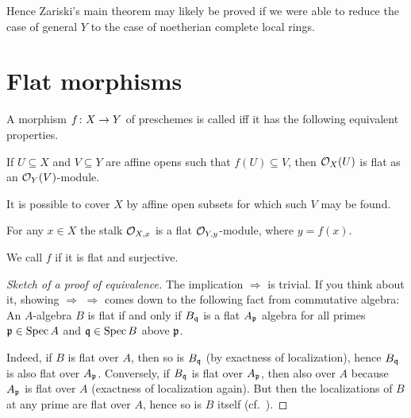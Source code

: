 \documentclass[a4paper,parskip=half,numbers=enddot, DIV=12]{scrreprt}
\begin{document}
Hence Zariski's main theorem may likely be proved if we were able to reduce the case of general $Y$ to the case of noetherian complete local rings.

\chapter{Flat morphisms}
\begin{defi}
	A morphism $f\colon X\morphism Y$ of preschemes is called  iff it has the following equivalent properties.
	\begin{alphanumerate}
		\item If $U\subseteq X$ and $V\subseteq Y$ are affine opens such that $f(U)\subseteq V$, then $\mathcal{O}_X(U)$ is flat as an $\mathcal{O}_Y(V)$-module.
		\item It is possible to cover $X$ by affine open subsets for which such $V$ may be found.
		\item For any $x\in X$ the stalk $\mathcal{O}_{X,x}$ is a flat $\mathcal{O}_{Y,y}$-module, where $y=f(x)$.
	\end{alphanumerate}
	We call $f$  if it is flat and surjective.
\end{defi}
\begin{proof}[Sketch of a proof of equivalence]
	The implication  $\Rightarrow$  is trivial. If you think about it, showing  $\Rightarrow$  $\Rightarrow$  comes down to the following fact from commutative algebra: An $A$-algebra $B$ is flat if and only if $B_{\mathfrak{q}}$ is a flat $A_{\mathfrak{p}}$ algebra for all primes $\mathfrak{p}\in\operatorname{Spec} A$ and $\mathfrak{q}\in\operatorname{Spec} B$ above $\mathfrak{p}$.
	
	Indeed, if $B$ is flat over $A$, then so is $B_{\mathfrak{q}}$ (by exactness of localization), hence $B_{\mathfrak{q}}$ is also flat over $A_{\mathfrak{p}}$. Conversely, if $B_{\mathfrak{q}}$ is flat over $A_{\mathfrak{p}}$, then also over $A$ because $A_{\mathfrak{p}}$ is flat over $A$ (exactness of localization again). But then the localizations of $B$ at any prime are flat over $A$, hence so is $B$ itself (cf.\ \cite[Fact~1.2.6]{homalg}).
\end{proof}
\end{document}
